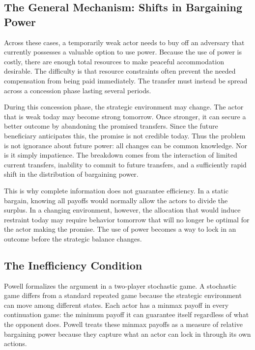 \subsection{The General Mechanism: Shifts in Bargaining Power}

Across these cases, a temporarily weak actor needs to buy off an adversary that currently possesses a valuable option to use power. Because the use of power is costly, there are enough total resources to make peaceful accommodation desirable. The difficulty is that resource constraints often prevent the needed compensation from being paid immediately. The transfer must instead be spread across a concession phase lasting several periods.

During this concession phase, the strategic environment may change. The actor that is weak today may become strong tomorrow. Once stronger, it can secure a better outcome by abandoning the promised transfers. Since the future beneficiary anticipates this, the promise is not credible today. Thus the problem is not ignorance about future power: all changes can be common knowledge. Nor is it simply impatience. The breakdown comes from the interaction of limited current transfers, inability to commit to future transfers, and a sufficiently rapid shift in the distribution of bargaining power.

This is why complete information does not guarantee efficiency. In a static bargain, knowing all payoffs would normally allow the actors to divide the surplus. In a changing environment, however, the allocation that would induce restraint today may require behavior tomorrow that will no longer be optimal for the actor making the promise. The use of power becomes a way to lock in an outcome before the strategic balance changes.

\subsection{The Inefficiency Condition}

Powell formalizes the argument in a two-player stochastic game. A stochastic game differs from a standard repeated game because the strategic environment can move among different states. Each actor has a minmax payoff in every continuation game: the minimum payoff it can guarantee itself regardless of what the opponent does. Powell treats these minmax payoffs as a measure of relative bargaining power because they capture what an actor can lock in through its own actions.

